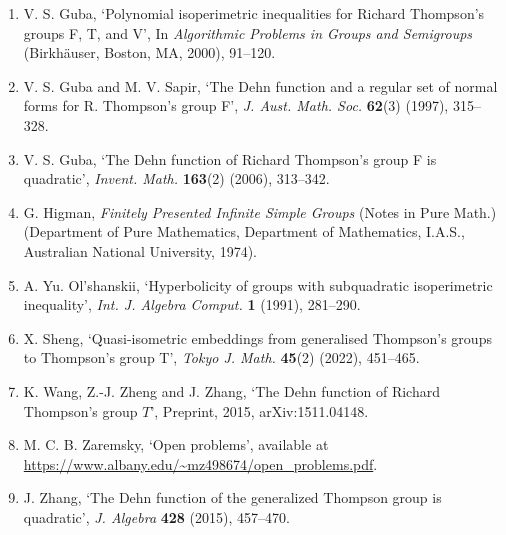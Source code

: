 \documentclass[10pt,a4paper]{article}
\begin{document}
\begin{enumerate}
\item V. S. Guba, `Polynomial isoperimetric inequalities for Richard Thompson's groups F, T, and V', In \emph{Algorithmic Problems in Groups and Semigroups} (Birkh\"auser, Boston, MA, 2000), 91--120.
\item V. S. Guba and M. V. Sapir, `The Dehn function and a regular set of normal forms for R. Thompson's group F', \emph{J. Aust. Math. Soc.} \textbf{62}(3) (1997), 315--328.
\item V. S. Guba, `The Dehn function of Richard Thompson's group F is quadratic', \emph{Invent. Math.} \textbf{163}(2) (2006), 313--342.
\item G. Higman, \emph{Finitely Presented Infinite Simple Groups} (Notes in Pure Math.) (Department of Pure Mathematics, Department of Mathematics, I.A.S., Australian National University, 1974).
\item A. Yu. Ol'shanskii, `Hyperbolicity of groups with subquadratic isoperimetric inequality', \emph{Int. J. Algebra Comput.} \textbf{1} (1991), 281--290.
\item X. Sheng, `Quasi-isometric embeddings from generalised Thompson's groups to Thompson's group T', \emph{Tokyo J. Math.} \textbf{45}(2) (2022), 451--465.
\item K. Wang, Z.-J. Zheng and J. Zhang, `The Dehn function of Richard Thompson's group $T$', Preprint, 2015, arXiv:1511.04148.
\item M. C. B. Zaremsky, `Open problems', available at\newline
\url{https://www.albany.edu/~mz498674/open_problems.pdf}.
\item J. Zhang, `The Dehn function of the generalized Thompson group is quadratic', \emph{J. Algebra} \textbf{428} (2015), 457--470.
\end{enumerate}
\end{document}
